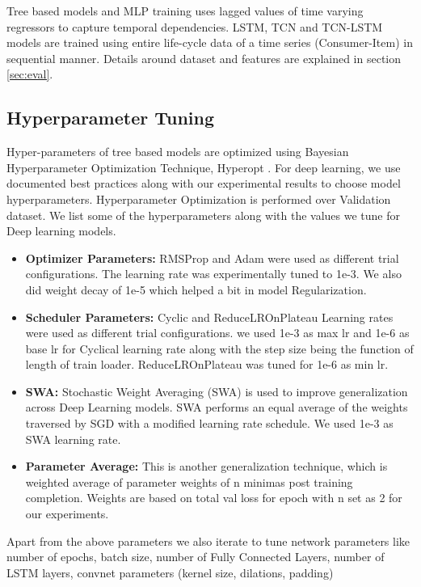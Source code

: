 Tree based models and MLP training uses lagged values of time varying regressors
to capture temporal dependencies. LSTM, TCN and TCN-LSTM models are trained using entire life-cycle data of a 
time series (Consumer-Item) in sequential manner. Details around dataset and features are explained in section \ref{sec:eval}. 

\subsection{Hyperparameter Tuning}
Hyper-parameters of tree based models are optimized
using Bayesian Hyperparameter Optimization Technique, Hyperopt \cite{bergstra2013hyperopt}. 
For deep learning, we use documented best practices along with our experimental results to
choose model hyperparameters. Hyperparameter Optimization is performed over Validation dataset. 
We list some of the hyperparameters along with the values we tune for Deep learning models.
  \begin{itemize}
    \item {\bf Optimizer Parameters:} RMSProp \cite{bengio2015rmsprop} and Adam were used as different trial configurations. The learning rate 
    was experimentally tuned to 1e-3. We also did weight decay of 1e-5 which helped a bit in model Regularization.
    \item {\bf Scheduler Parameters:} Cyclic \cite{smith2017cyclical} and ReduceLROnPlateau \cite{zaheer2018adaptive} 
    Learning rates were used as different trial configurations.
    we used 1e-3 as max lr and 1e-6 as base lr for Cyclical learning rate along with the step size being the function of
    length of train loader. ReduceLROnPlateau was tuned for 1e-6 as min lr.
    \item {\bf SWA:} Stochastic Weight Averaging (SWA) \cite{izmailov2018averaging} is used to improve generalization across Deep Learning
    models. SWA performs an equal average of the weights traversed by SGD with a modified learning rate schedule. We used 
    1e-3 as SWA learning rate.
    \item {\bf Parameter Average:} This is another generalization technique, which is weighted average of parameter weights 
    of n minimas post training completion. Weights are based on total val loss for epoch with n set as 2 for our 
    experiments.
  \end{itemize}
Apart from the above parameters we also iterate to tune network parameters like number of epochs, batch size, 
number of Fully Connected Layers, number of LSTM layers, convnet parameters (kernel size, dilations, padding)
